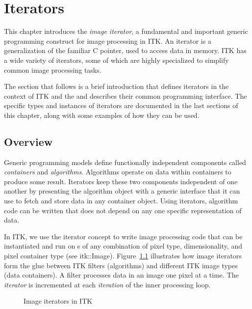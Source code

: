 \chapter{Iterators}

This chapter introduces the \emph{image iterator}, a fundamental and important
generic programming construct for image processing in ITK.  An iterator is a
generalization of the familiar C pointer, used to access data in memory.  ITK
has a wide variety of iterators, some of which are highly specialized to
simplify common image processing tasks.

The section that follows is a brief introduction that defines iterators in the
context of ITK and the  and describes their common programming
interface.  The specific types and instances of iterators are documented in the
last sections of this chapter, along with some examples of how they can be
used.

\section{Overview}
\label{sec:IteratorsIntroduction}
Generic programming models define functionally independent components called
\emph{containers} and \emph{algorithms}.  Algorithms operate on data
within containers to produce some result.  Iterators keep these two components
independent of one another by presenting the algorithm object with a generic
interface that it can use to fetch and store data in any container object.
Using iterators, algorithm code can be written that does not depend on any one
specific representation of data.

In ITK, we use the iterator concept to write image processing code that can be
instantiated and run on s of any combination of pixel type,
dimensionality, and pixel container type (see itk::Image).
Figure~\ref{fig:ImageIterators} illustrates how image iterators form the glue
between ITK filters (algorithms) and different ITK image types (data
containers). A filter processes data in an image one pixel at a time.  The
\emph{iterator} is incremented at each \emph{iteration} of the inner processing
loop.

\begin{figure}
\centering
\caption[Image iterators in ITK]{Image iterators in ITK}
\protect\label{fig:ImageIterators}
\end{figure}

